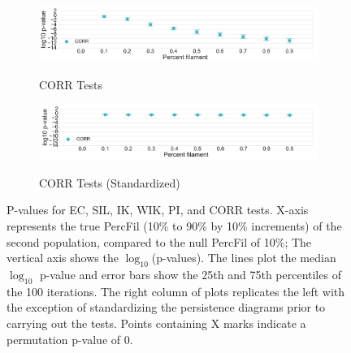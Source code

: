 \documentclass[12pt]{article}
\begin{document}
\begin{description}
\begin{center}
\begin{figure}[htp!]
\begin{subfigure}{.48\textwidth}
        \label{fig:all_weight_normed}
      \end{subfigure}
      \begin{subfigure}{.48\textwidth}
        \caption{CORR Tests}
        \includegraphics[width=\linewidth, height = .75in]{figure_8_all_correlation_group.pdf}
        \label{fig:all_corr}
      \end{subfigure}
      \begin{subfigure}{.48\textwidth}
        \caption{CORR Tests (Standardized)}
        \includegraphics[width=\linewidth, height = .75in]{figure_8_all_correlation_group_normed.pdf}
        \label{fig:all_corr_normed}
      \end{subfigure}
      \caption{P-values for EC, SIL, IK, WIK, PI, and CORR tests. X-axis represents the true PercFil (10\% to 90\% by 10\% increments) of the second population, compared to the null PercFil of 10\%; 
      The vertical axis shows the $\log_{10}$(p-values). The lines plot the median $\log_{10}$ p-value and error bars show the 25th and 75th percentiles of the 100 iterations. 
 The right column of plots replicates the left with the exception of standardizing the persistence diagrams prior to carrying out the tests.    Points containing X marks indicate a permutation p-value of 0.  
      }
      \label{fig:linesUnnormApp}
    \end{figure}
  \end{center}
\end{description}




\end{document}
